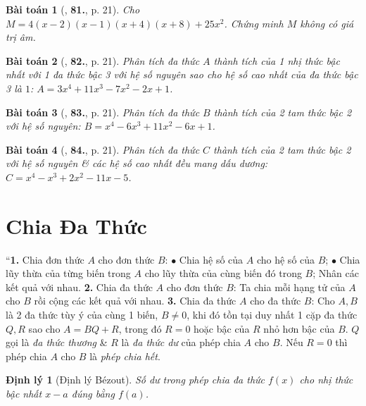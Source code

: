 \documentclass{article}
\numberwithin{equation}{section}
\newtheorem{baitoan}{Bài toán}
\newtheorem{dinhly}{Định lý}[section]
\begin{document}
\begin{baitoan}[\cite{Tuyen_Toan_8}, \textbf{81.}, p. 21]
	Cho $M = 4(x - 2)(x - 1)(x + 4)(x + 8) + 25x^2$. Chứng minh $M$ không có giá trị âm.
\end{baitoan}

\begin{baitoan}[\cite{Tuyen_Toan_8}, \textbf{82.}, p. 21]
	Phân tích đa thức $A$ thành tích của 1 nhị thức bậc nhất với 1 đa thức bậc 3 với hệ số nguyên sao cho hệ số cao nhất của đa thức bậc 3 là $1$: $A = 3x^4 + 11x^3 - 7x^2 - 2x + 1$.
\end{baitoan}

\begin{baitoan}[\cite{Tuyen_Toan_8}, \textbf{83.}, p. 21]
	Phân tích đa thức $B$ thành tích của 2 tam thức bậc 2 với hệ số nguyên: $B = x^4 - 6x^3 + 11x^2 - 6x + 1$.
\end{baitoan}

\begin{baitoan}[\cite{Tuyen_Toan_8}, \textbf{84.}, p. 21]
	Phân tích đa thức $C$ thành tích của 2 tam thức bậc 2 với hệ số nguyên \& các hệ số cao nhất đều mang dấu dương: $C = x^4 - x^3 + 2x^2 - 11x - 5$.
\end{baitoan}


\section{Chia Đa Thức}
``\textbf{1.} Chia đơn thức $A$ cho đơn thức $B$: $\bullet$ Chia hệ số của $A$ cho hệ số của $B$; $\bullet$ Chia lũy thừa của từng biến trong $A$ cho lũy thừa của cùng biến đó trong $B$; Nhân các kết quả với nhau. \textbf{2.} Chia đa thức $A$ cho đơn thức $B$: Ta chia mỗi hạng tử của $A$ cho $B$ rồi cộng các kết quả với nhau. \textbf{3.} Chia đa thức $A$ cho đa thức $B$: Cho $A,B$ là 2 đa thức tùy ý của cùng 1 biến, $B\ne 0$, khi đó tồn tại duy nhất 1 cặp đa thức $Q,R$ sao cho $A = BQ + R$, trong đó $R = 0$ hoặc bậc của $R$ nhỏ hơn bậc của $B$. $Q$ gọi là \textit{đa thức thương} \& $R$ là \textit{đa thức dư} của phép chia $A$ cho $B$. Nếu $R = 0$ thì phép chia $A$ cho $B$ là \textit{phép chia hết}.

\begin{dinhly}[Định lý B\'ezout]
	Số dư trong phép chia đa thức $f(x)$ cho nhị thức bậc nhất $x - a$ đúng bằng $f(a)$.
\end{dinhly}
\end{document}
